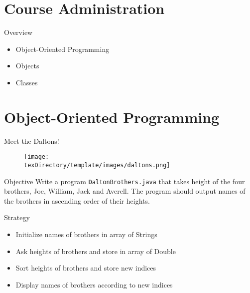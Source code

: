 \documentclass[10pt, compress]{beamer}
\begin{document}
\prepareCover

\section{Course Administration}

\begin{slide}
	\begin{block}{Overview}
		\begin{itemize}
			\item[] Object-Oriented Programming
			\item[] Objects
			\item[] Classes
		\end{itemize}
	\end{block}
\end{slide}

\section{Object-Oriented Programming}

\begin{slide}
	\begin{block}{Meet the Daltons!}
		\begin{figure}[H]\centering
			\texttt{[image: \\texDirectory/template/images/daltons.png]}
		\end{figure}
	\end{block}
\end{slide}

\begin{slide}
	\begin{block}{Objective}
		Write a program \texttt{DaltonBrothers.java} that takes height of the four brothers, Joe, William, Jack and Averell.
		The program should output names of the brothers in ascending order of their heights.
	\end{block}
\end{slide}

\begin{slide}
	\begin{block}{Strategy}
		\begin{itemize}
			\item[] Initialize names of brothers in array of Strings
			\item[] Ask heights of brothers and store in array of Double
			\item[] Sort heights of brothers and store new indices
			\item[] Display names of brothers according to new indices
		\end{itemize}
	\end{block}
\end{slide}
\end{document}
